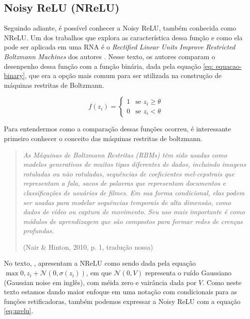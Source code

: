 \subsection{Noisy ReLU (NReLU)}

Seguindo adiante, é possível conhecer a Noisy ReLU, também conhecida como NReLU. Um dos trabalhos que explora as característica dessa função e como ela pode ser aplicada em uma RNA é o \textit{Rectified Linear Units Improve Restricted Boltzmann Machines} dos autores \textcite{Nair2010}. Nesse texto, os autores comparam o desenpenho dessa função com a função binária, dada pela equação \ref{eq: equacao-binary}, que era a opção mais comum para ser utilizada na construção de máquinas restritas de Boltzmann.

\begin{equation}
    f(z_i) = \begin{cases} 
    1 & \text{se } z_i \ge \theta \\ 
    0 & \text{se } z_i < \theta 
    \end{cases}
    \label{eq: equacao-binary}
\end{equation}

Para entendermos como a comparação dessas funções ocorreu, é interessante primeiro conhecer o conceito das máquinas restritas de boltzmann.

\begin{quote}
    \textit{As Máquinas de Boltzmann Restritas (RBMs) têm sido usadas como modelos generativos de muitos tipos diferentes de dados, incluindo imagens rotuladas ou não rotuladas, sequências de coeficientes mel-cepstrais que representam a fala, sacos de palavras que representam documentos e classificações de usuários de filmes. Em sua forma condicional, elas podem ser usadas para modelar sequências temporais de alta dimensão, como dados de vídeo ou captura de movimento. Seu uso mais importante é como módulos de aprendizagem que são compostos para formar redes de crenças profundas.}

\hfill \textemdash (Nair \& Hinton, 2010, p. 1, tradução nossa)
\end{quote}

No texto, \textcite{Nair2010}, apresentam a NReLU como sendo dada pela equação $\max{0, z_i + \mathcal{N}(0, \sigma(z_i))}$, em que $\mathcal{N}(0, V)$ representa o ruído Gaussiano (Gaussian noise em inglês), com méida zero e vairância dada por $V$. Como neste texto estamos dando maior enfoque em uma notação com condicionais para as funções retificadoras, também podemos expressar a Noisy ReLU com a equação \ref{eq:nrelu}.


